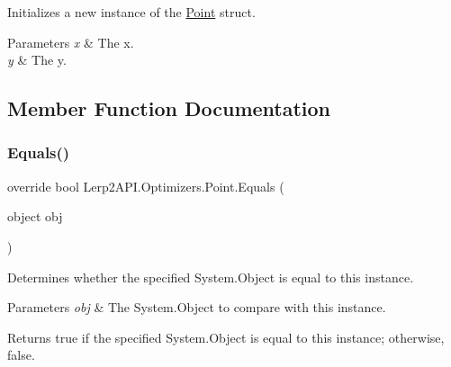 Initializes a new instance of the \hyperlink{struct_lerp2_a_p_i_1_1_optimizers_1_1_point}{Point} struct. 


\begin{DoxyParams}{Parameters}
{\em x} & The x.\\
\hline
{\em y} & The y.\\
\hline
\end{DoxyParams}


\subsection{Member Function Documentation}
\mbox{\label{struct_lerp2_a_p_i_1_1_optimizers_1_1_point_a869dfe6b92fa685d7688724359a53160}} 
\subsubsection{\texorpdfstring{Equals()}{Equals()}}
{\footnotesize\ttfamily override bool Lerp2\+A\+P\+I.\+Optimizers.\+Point.\+Equals (\begin{DoxyParamCaption}\item[{object}]{obj }\end{DoxyParamCaption})\hspace{0.3cm}{\ttfamily [inline]}}



Determines whether the specified System.\+Object is equal to this instance. 


\begin{DoxyParams}{Parameters}
{\em obj} & The System.\+Object to compare with this instance.\\
\hline
\end{DoxyParams}
\begin{DoxyReturn}{Returns}
{\ttfamily true} if the specified System.\+Object is equal to this instance; otherwise, {\ttfamily false}.
\end{DoxyReturn}
\mbox{\label{struct_lerp2_a_p_i_1_1_optimizers_1_1_point_a591668a0f9a19a0c1bc1ee86894d07cf}} 
